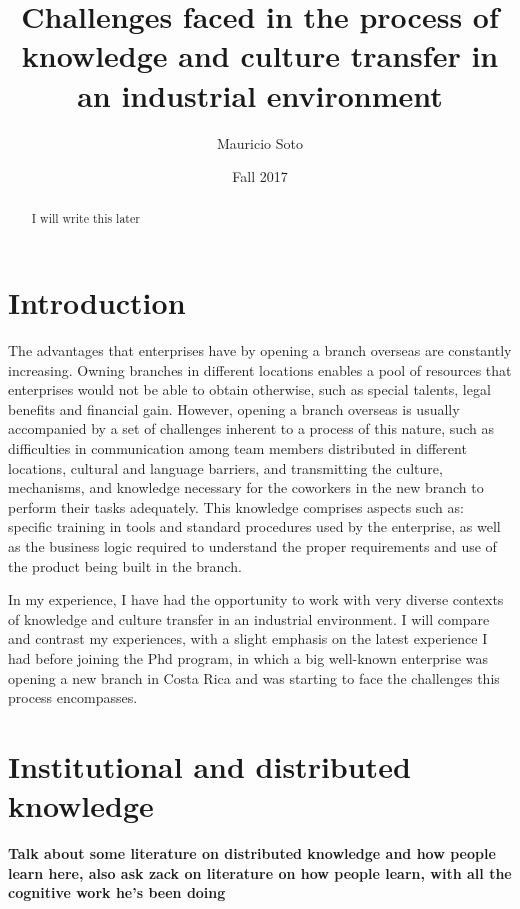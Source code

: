 \documentclass[12pt, letterpaper]{article}
\title{Challenges faced in the process of knowledge and culture transfer in an industrial environment}
\author{Mauricio Soto}
\date{Fall 2017}
\newcommand{\todo}[1]
  {{\scriptsize \textbf{\color{red} {#1}}}}
\begin{document}
 
\begin{titlepage}
\maketitle
\end{titlepage}

\begin{abstract}
I will write this later
\end{abstract}
 
 
\section{Introduction}

The advantages that enterprises have by opening a branch overseas are constantly increasing.
Owning branches in different locations enables a pool of resources that enterprises would not be able
to obtain otherwise, such as special talents, legal benefits and financial gain. However, 
opening a branch overseas is usually accompanied by a set of challenges inherent to a process of this nature, such as 
difficulties in communication among team members distributed in different locations, 
cultural and language barriers, and transmitting the culture, mechanisms, and knowledge necessary for the 
coworkers in the new branch to perform their tasks adequately. 
This knowledge comprises aspects such as: specific training in tools and standard procedures used by the enterprise, as well as the
business logic required to understand the proper requirements and use of the product being built
in the branch.

In my experience, I have had the opportunity to work with very diverse contexts of knowledge and culture transfer in 
an industrial environment. I will compare and contrast my experiences, with a slight emphasis on the 
latest experience I had before joining the Phd program, in which a big well-known enterprise was 
opening a new branch in Costa Rica and was starting to face the challenges this process encompasses.  




 




\section{Institutional and distributed knowledge}

\todo{Talk about some literature on distributed knowledge and how people learn here, also ask zack on literature on how people learn, with all the cognitive work he's been doing}
 
\end{document}
